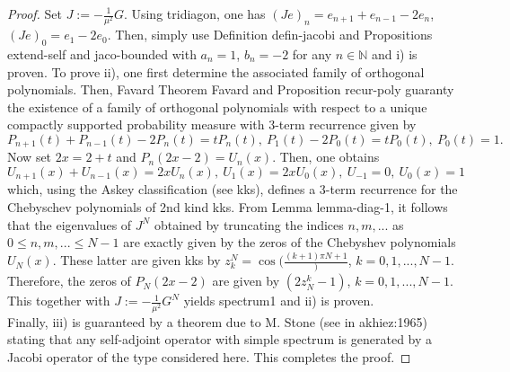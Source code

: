 \documentclass[10pt]{book}
\theoremstyle{break}
\begin{document}
\begin{proof}
Set $J:=-\frac{1}{\mu^2}G$. Using {tridiagon}, one has $(Je)_n=e_{n+1}+e_{n-1}-2e_n$, $(Je)_0=e_1-2e_0$. Then, simply use Definition {defin-jacobi} and Propositions {extend-self} and {jaco-bounded} with $a_n=1$, $b_n=-2$ for any $n\in\mathbb{N}$ and i) is proven.
To prove ii), one first determine the associated family of orthogonal polynomials. Then, Favard Theorem {Favard} and Proposition {recur-poly} guaranty the 
existence of a family of orthogonal polynomials with respect to a unique compactly supported probability measure with 3-term recurrence given by
\begin{equation*}
P_{n+1}(t)+P_{n-1}(t)-2P_n(t)=tP_n(t),\ P_1(t)-2P_0(t)=tP_0(t),\ P_0(t)=1.
\end{equation*}
Now set $2x=2+t$ and $P_n(2x-2)=U_n(x)$. Then, one obtains
\begin{equation*}
U_{n+1}(x)+U_{n-1}(x)=2xU_n(x),\ U_1(x)=2xU_0(x),\ U_{-1}=0,\ U_0(x)=1
\end{equation*}
which, using the Askey classification (see {kks}), defines a 3-term recurrence for the Chebyschev polynomials of 2nd kind {kks}. From Lemma {lemma-diag-1}, it follows that the eigenvalues of $J^N$ obtained by truncating the indices $n,m,...$ as $0\le n,m,...\le N-1$ are exactly given by the zeros of the Chebyshev polynomials $U_N(x)$. These latter are given {kks} by $z_k^N=\cos(\frac{{(k+1)\pi}{N+1}})$, $k=0,1,...,N-1$. Therefore, the zeros of $P_N(2x-2)$ are given by $(2z^k_N-1)$, $k=0,1,...,N-1$. This together with $J:=-\frac{1}{\mu^2}G^N$ yields {spectrum1} and ii) is proven. \\
Finally, iii) is guaranteed by a theorem due to M. Stone (see in {akhiez:1965}) stating that any self-adjoint operator with simple spectrum is generated by a Jacobi operator of the type considered here. This completes the proof.
\end{proof}
\end{document}
